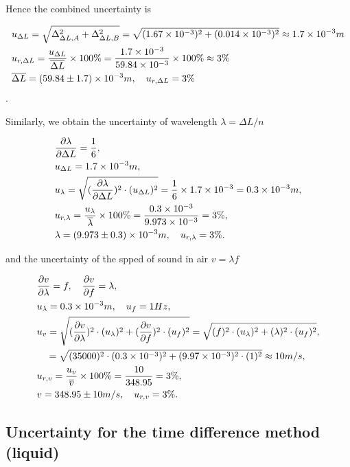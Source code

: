 Hence the combined uncertainty is 

\[
\begin{split}
    &u_{\Delta L}=\sqrt{\Delta_{\Delta L,A}^2+\Delta_{\Delta
        L,B}^2}=\sqrt{(1.67\times 10^{-3})^2+(0.014\times 10^{-3})^2}\approx1.7\times 10^{-3}m\\ 
    &u_{r,\Delta L}=\frac{u_{\Delta L}}{\overline{\Delta L}}\times
    100\%=\frac{1.7\times 10^{-3}}{59.84\times 10^{-3}}\times100\%\approx3\%\\ 
    &\overline{\Delta L}=(59.84\pm 1.7)\times 10^{-3}m,\quad u_{r,\Delta L}=3\% 
\end{split}
\].

Similarly, we obtain the uncertainty of wavelength $\lambda=\Delta L/n$

\[
\begin{split}
    &\frac{\partial \lambda}{\partial \Delta L}=\frac{1}{6},\\ 
    &u_{\Delta L}=1.7\times 10^{-3}m,\\
    &u_{\lambda}=\sqrt{(\frac{\partial \lambda}{\partial \Delta L})^2\cdot
      (u_{\Delta L})^2}=\frac{1}{6}\times 1.7\times 10^{-3}=0.3\times 10^{-3}m,\\ 
    &u_{r,\lambda}=\frac{u_{\lambda}}{\overline{\lambda}}\times
    100\%=\frac{0.3\times 10^{-3}}{9.973\times 10^{-3}}=3\%,\\ 
    &\lambda=(9.973\pm0.3)\times 10^{-3}m,\quad u_{r,\lambda}=3\%. 
\end{split}
\]

and the uncertainty of the spped of sound in air $v=\lambda f$

\[
\begin{split}
    &\frac{\partial v}{\partial \lambda}=f,\quad \frac{\partial v}{\partial 
      f}=\lambda,\\ 
    &u_{\lambda}=0.3\times 10^{-3}m,\quad u_{f}=1Hz,\\
    &u_{v}=\sqrt{(\frac{\partial v}{\partial \lambda})^2\cdot
      (u_{\lambda})^2+(\frac{\partial v}{\partial f})^2\cdot
      (u_{f})^2}=\sqrt{(f)^2\cdot (u_{\lambda})^2+(\lambda)^2\cdot
      (u_{f})^2},\\ 
    &\quad =\sqrt{(35000)^2\cdot(0.3\times 10^{-3})^2+(9.97\times 10^{-3})^2\cdot(1)^2}
    \approx10m/s,\\
    &u_{r,v}=\frac{u_v}{\overline{v}}\times 100\%=\frac{10}{348.95}=3\%,\\
    &v=348.95\pm10 m/s,\quad u_{r,v}=3\%.
\end{split}
\]

\subsection{Uncertainty for the time difference method (liquid)}

